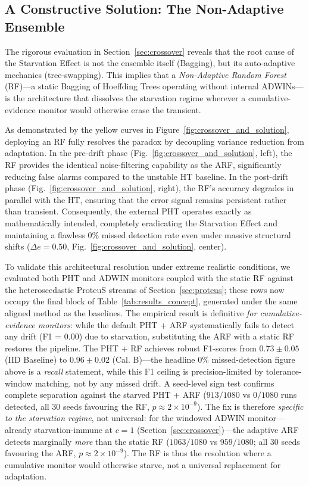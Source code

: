 \documentclass[10pt,conference]{IEEEtran}
\theoremstyle{definition}
\begin{document}


\subsection{A Constructive Solution: The Non-Adaptive Ensemble}\label{sec:solution_rf}

The rigorous evaluation in Section~\ref{sec:crossover} reveals that the root cause of the Starvation Effect is not the ensemble itself (Bagging), but its auto-adaptive mechanics (tree-swapping). This implies that a \emph{Non-Adaptive Random Forest} (RF)---a static Bagging of Hoeffding Trees operating without internal ADWINs---is the architecture that dissolves the starvation regime wherever a cumulative-evidence monitor would otherwise erase the transient.

As demonstrated by the yellow curves in Figure~\ref{fig:crossover_and_solution}, deploying an RF fully resolves the paradox by decoupling variance reduction from adaptation. In the pre-drift phase (Fig.~\ref{fig:crossover_and_solution}, left), the RF provides the identical noise-filtering capability as the ARF, significantly reducing false alarms compared to the unstable HT baseline. In the post-drift phase (Fig.~\ref{fig:crossover_and_solution}, right), the RF's accuracy degrades in parallel with the HT, ensuring that the error signal remains persistent rather than transient. Consequently, the external PHT operates exactly as mathematically intended, completely eradicating the Starvation Effect and maintaining a flawless $0\%$ missed detection rate even under massive structural shifts ($\Delta e = 0.50$, Fig.~\ref{fig:crossover_and_solution}, center).

To validate this architectural resolution under extreme realistic conditions, we evaluated both PHT and ADWIN monitors coupled with the static RF against the heteroscedastic ProteuS streams of Section~\ref{sec:proteus}; these rows now occupy the final block of Table~\ref{tab:results_concept}, generated under the same aligned method as the baselines. The empirical result is definitive \emph{for cumulative-evidence monitors}: while the default PHT + ARF systematically fails to detect any drift (F1 = 0.00) due to starvation, substituting the ARF with a static RF restores the pipeline. The PHT + RF achieves robust F1-scores from $0.73 \pm 0.05$ (IID Baseline) to $0.96 \pm 0.02$ (Cal. B)---the headline $0\%$ missed-detection figure above is a \emph{recall} statement, while this F1 ceiling is precision-limited by tolerance-window matching, not by any missed drift. A seed-level sign test confirms complete separation against the starved PHT + ARF ($913/1080$ vs $0/1080$ runs detected, all $30$ seeds favouring the RF, $p \approx 2 \times 10^{-9}$). The fix is therefore \emph{specific to the starvation regime}, not universal: for the windowed ADWIN monitor---already starvation-immune at $c = 1$ (Section~\ref{sec:crossover})---the adaptive ARF detects marginally \emph{more} than the static RF ($1063/1080$ vs $959/1080$; all $30$ seeds favouring the ARF, $p \approx 2 \times 10^{-9}$). The RF is thus the resolution where a cumulative monitor would otherwise starve, not a universal replacement for adaptation.
\end{document}
